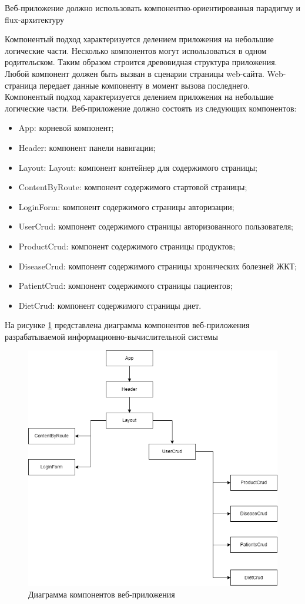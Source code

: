Веб-приложение должно использовать компонентно-ориентированная парадигму и flux-архитектуру

Компонентый подход характеризуется делением приложения на небольшие логические части. Несколько компонентов могут использоваться в одном родительском. Таким образом строится древовидная структура
приложения. Любой компонент должен быть вызван в сценарии страницы web-сайта. Web-страница передает данные компоненту в момент вызова последнего. Компонентый подход характеризуется делением приложения на небольшие логические части.
Веб-приложение должно состоять из следующих компонентов:
\begin{itemize}
	\item App: корневой компонент;
	\item Header: компонент панели навигации;
	\item Layout:  Layout: компонент контейнер для содержимого страницы;
	\item ContentByRoute: компонент содержимого стартовой страницы;
	\item LoginForm: компонент содержимого страницы авторизации;
	\item UserCrud: компонент содержимого страницы авторизованного пользователя;
	\item ProductCrud: компонент содержимого страницы продуктов;
	\item DiseaseCrud: компонент содержимого страницы хронических болезней ЖКТ;
	\item PatientCrud: компонент содержимого страницы пациентов;
	\item DietCrud: компонент содержимого страницы диет.
\end{itemize}

На рисунке \ref{fig:comp} представлена диаграмма компонентов веб-приложения разрабатываемой информационно-вычислительной системы

\begin{figure}[H]
	\centering
	\includegraphics[width=0.7\linewidth]{"images/Диаграмма компонентов.drawio (1)"}
	\caption{Диаграмма компонентов веб-приложения}
	\label{fig:comp}
\end{figure}

